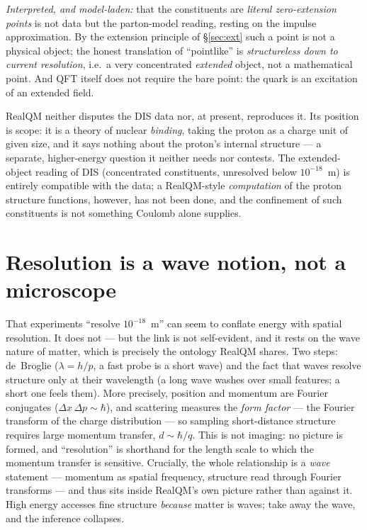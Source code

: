 \documentclass[11pt]{article}
\begin{document}
\emph{Interpreted, and model-laden:} that the constituents are \emph{literal zero-extension points} is not
data but the parton-model reading, resting on the impulse approximation. By the extension principle of
\S\ref{sec:ext} such a point is not a physical object; the honest translation of ``pointlike'' is
\emph{structureless down to current resolution}, i.e.\ a very concentrated \emph{extended} object, not a
mathematical point. And QFT itself does not require the bare point: the quark is an excitation of an
extended field.

RealQM neither disputes the DIS data nor, at present, reproduces it. Its position is scope: it is a theory
of nuclear \emph{binding}, taking the proton as a charge unit of given size, and it says nothing about the
proton's internal structure --- a separate, higher-energy question it neither needs nor contests. The
extended-object reading of DIS (concentrated constituents, unresolved below $10^{-18}$~m) is entirely
compatible with the data; a RealQM-style \emph{computation} of the proton structure functions, however, has
not been done, and the confinement of such constituents is not something Coulomb alone supplies.

\section{Resolution is a wave notion, not a microscope}
\label{sec:res}

That experiments ``resolve $10^{-18}$~m'' can seem to conflate energy with spatial resolution. It does not
--- but the link is not self-evident, and it rests on the wave nature of matter, which is precisely the
ontology RealQM shares. Two steps: de~Broglie ($\lambda=h/p$, a fast probe is a short wave) and the fact
that waves resolve structure only at their wavelength (a long wave washes over small features; a short one
feels them). More precisely, position and momentum are Fourier conjugates ($\Delta x\,\Delta p\sim\hbar$),
and scattering measures the \emph{form factor} --- the Fourier transform of the charge distribution --- so
sampling short-distance structure requires large momentum transfer, $d\sim\hbar/q$. This is not imaging: no
picture is formed, and ``resolution'' is shorthand for the length scale to which the momentum transfer is
sensitive. Crucially, the whole relationship is a \emph{wave} statement --- momentum as spatial frequency,
structure read through Fourier transforms --- and thus sits inside RealQM's own picture rather than against
it. High energy accesses fine structure \emph{because} matter is waves; take away the wave, and the
inference collapses.
\end{document}
